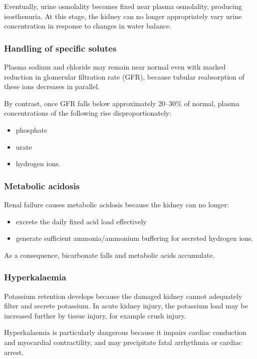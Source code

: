 \documentclass[11pt,a4paper]{article}
\begin{document}
Eventually, urine osmolality becomes fixed near plasma osmolality, producing isosthenuria. At this stage, the kidney can no longer appropriately vary urine concentration in response to changes in water balance.\cite{KamPowerRenalFailure}

\subsubsection{Handling of specific solutes}

Plasma sodium and chloride may remain near normal even with marked reduction in glomerular filtration rate (GFR), because tubular reabsorption of these ions decreases in parallel.

By contrast, once GFR falls below approximately 20--30\% of normal, plasma concentrations of the following rise disproportionately:
\begin{itemize}
  \item phosphate
  \item urate
  \item hydrogen ions.
\end{itemize}

\subsubsection{Metabolic acidosis}

Renal failure causes metabolic acidosis because the kidney can no longer:
\begin{itemize}
  \item excrete the daily fixed acid load effectively
  \item generate sufficient ammonia/ammonium buffering for secreted hydrogen ions.
\end{itemize}

As a consequence, bicarbonate falls and metabolic acids accumulate.\cite{KamPowerRenalFailure}

\subsubsection{Hyperkalaemia}

Potassium retention develops because the damaged kidney cannot adequately filter and secrete potassium. In acute kidney injury, the potassium load may be increased further by tissue injury, for example crush injury.

Hyperkalaemia is particularly dangerous because it impairs cardiac conduction and myocardial contractility, and may precipitate fatal arrhythmia or cardiac arrest.\cite{KamPowerRenalFailure}
\end{document}
